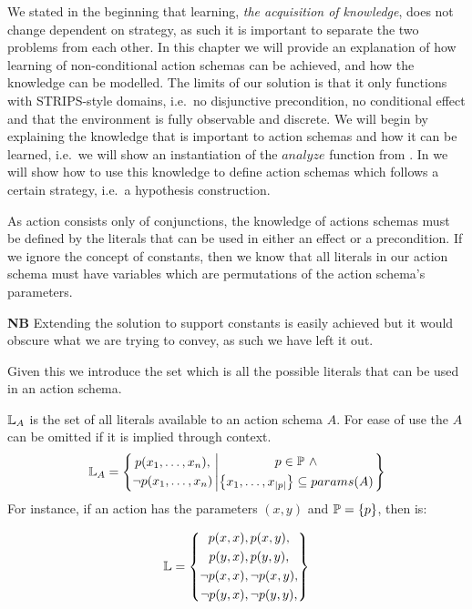 \documentclass[Master.tex]{subfiles}
\begin{document}
We stated in the beginning that learning, \emph{the acquisition of knowledge}, does not change dependent on strategy, as such it is important to separate the two problems from each other.
In this chapter we will provide an explanation of how learning of non-conditional action schemas can be achieved, and how the knowledge can be modelled.
The limits of our solution is that it only functions with STRIPS-style domains, i.e.\ no disjunctive precondition, no conditional effect and that the environment is fully observable and discrete.
We will begin by explaining the knowledge that is important to action schemas and how it can be learned, i.e.\ we will show an instantiation of the $analyze$ function from .
In  we will show how to use this knowledge to define action schemas which follows a certain strategy, i.e.\ a hypothesis construction.

As action consists only of conjunctions, the knowledge of actions schemas must be defined by the literals that can be used in either an effect or a precondition.
If we ignore the concept of constants, then we know that all literals in our action schema must have variables which are permutations of the  action schema's parameters.

\textbf{NB} Extending the solution to support constants is easily achieved but it would obscure what we are trying to convey, as such we have left it out.
 
Given this we introduce the set \lits which is all the possible literals that can be used in an action schema.

\begin{definition} 
	$\mathbb{L}_A$ is the set of all literals available to an action schema $A$. For ease of use the $A$ can be omitted if it is implied through context.
	\begin{equation*}
	\mathbb{L}_A = \left\{ 
	\begin{gathered}
	p(x_1,\dots,x_n), \\
	\neg p(x_1,\dots,x_n)
	\end{gathered}
	\left|
	\begin{gathered} p \in \mathbb{P}~\land \\
	\left\{ x_1,\dots,x_{|p|} \right\} \subseteq params(A)
	\end{gathered}				
	\right.\right\}
	\end{equation*}
	For instance, if an action has the parameters $(x,y)$ and $\mathbb{P} = \{ p \}$, then \lits is:
	
	\begin{equation*}
		\mathbb{L} = \left\{
		\begin{gathered}
			p(x,x), 
			p(x,y), \\
			p(y,x), 
			p(y,y), \\
	\neg	p(x,x), 
	\neg	p(x,y), \\
	\neg	p(y,x), 
	\neg	p(y,y),
		\end{gathered}
		\right\}
	\end{equation*}
	
\end{definition}
\end{document}
